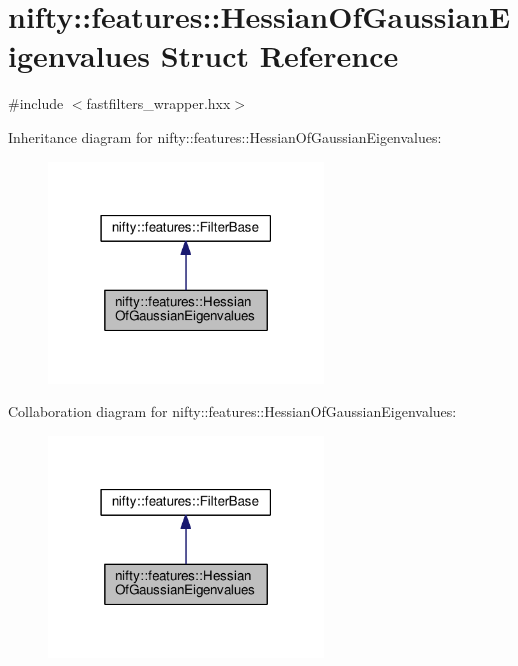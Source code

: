 \hypertarget{structnifty_1_1features_1_1HessianOfGaussianEigenvalues}{}\section{nifty\+:\+:features\+:\+:Hessian\+Of\+Gaussian\+Eigenvalues Struct Reference}
\label{structnifty_1_1features_1_1HessianOfGaussianEigenvalues}


{\ttfamily \#include $<$fastfilters\+\_\+wrapper.\+hxx$>$}



Inheritance diagram for nifty\+:\+:features\+:\+:Hessian\+Of\+Gaussian\+Eigenvalues\+:\nopagebreak
\begin{figure}[H]
\begin{center}
\leavevmode
\includegraphics[width=207pt]{structnifty_1_1features_1_1HessianOfGaussianEigenvalues__inherit__graph}
\end{center}
\end{figure}


Collaboration diagram for nifty\+:\+:features\+:\+:Hessian\+Of\+Gaussian\+Eigenvalues\+:\nopagebreak
\begin{figure}[H]
\begin{center}
\leavevmode
\includegraphics[width=207pt]{structnifty_1_1features_1_1HessianOfGaussianEigenvalues__coll__graph}
\end{center}
\end{figure}
